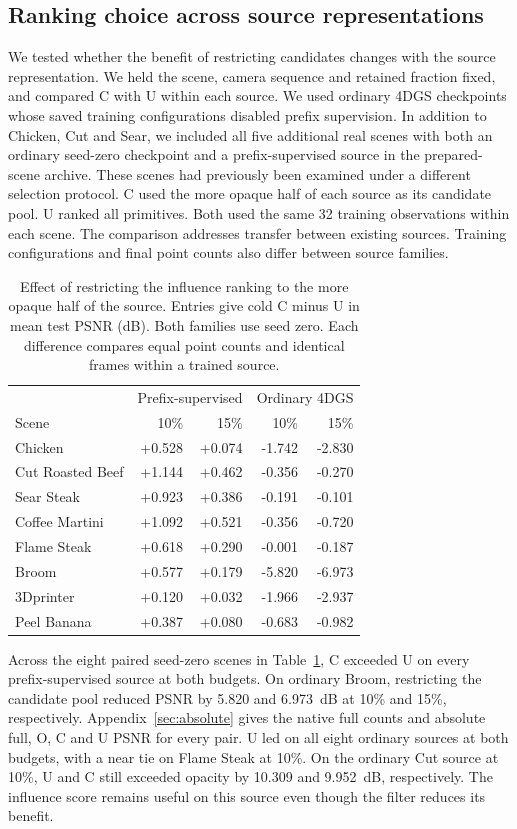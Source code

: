 \subsection{Ranking choice across source representations}\label{sec:sourcefamily}
We tested whether the benefit of restricting candidates changes with the source representation. We held the scene, camera sequence and retained fraction fixed, and compared C with U within each source. We used ordinary 4DGS checkpoints whose saved training configurations disabled prefix supervision. In addition to Chicken, Cut and Sear, we included all five additional real scenes with both an ordinary seed-zero checkpoint and a prefix-supervised source in the prepared-scene archive. These scenes had previously been examined under a different selection protocol. C used the more opaque half of each source as its candidate pool. U ranked all primitives. Both used the same 32 training observations within each scene. The comparison addresses transfer between existing sources. Training configurations and final point counts also differ between source families.
\begin{table}[!htbp]\centering\small
\caption{Effect of restricting the influence ranking to the more opaque half of the source. Entries give cold C minus U in mean test PSNR (dB). Both families use seed zero. Each difference compares equal point counts and identical frames within a trained source.}\label{tab:sourcefilter}
\begin{tabular}{lrrrr}\toprule
&\multicolumn{2}{c}{Prefix-supervised}&\multicolumn{2}{c}{Ordinary 4DGS}\\
Scene & 10\% & 15\% & 10\% & 15\% \\\midrule
Chicken & +0.528 & +0.074 & -1.742 & -2.830 \\
Cut Roasted Beef & +1.144 & +0.462 & -0.356 & -0.270 \\
Sear Steak & +0.923 & +0.386 & -0.191 & -0.101 \\
Coffee Martini & +1.092 & +0.521 & -0.356 & -0.720 \\
Flame Steak & +0.618 & +0.290 & -0.001 & -0.187 \\
Broom & +0.577 & +0.179 & -5.820 & -6.973 \\
3Dprinter & +0.120 & +0.032 & -1.966 & -2.937 \\
Peel Banana & +0.387 & +0.080 & -0.683 & -0.982 \\
\bottomrule\end{tabular}\end{table}
Across the eight paired seed-zero scenes in Table~\ref{tab:sourcefilter}, C exceeded U on every prefix-supervised source at both budgets. On ordinary Broom, restricting the candidate pool reduced PSNR by 5.820 and 6.973~dB at 10\% and 15\%, respectively. Appendix~\ref{sec:absolute} gives the native full counts and absolute full, O, C and U PSNR for every pair. U led on all eight ordinary sources at both budgets, with a near tie on Flame Steak at 10\%. On the ordinary Cut source at 10\%, U and C still exceeded opacity by 10.309 and 9.952~dB, respectively. The influence score remains useful on this source even though the filter reduces its benefit.




